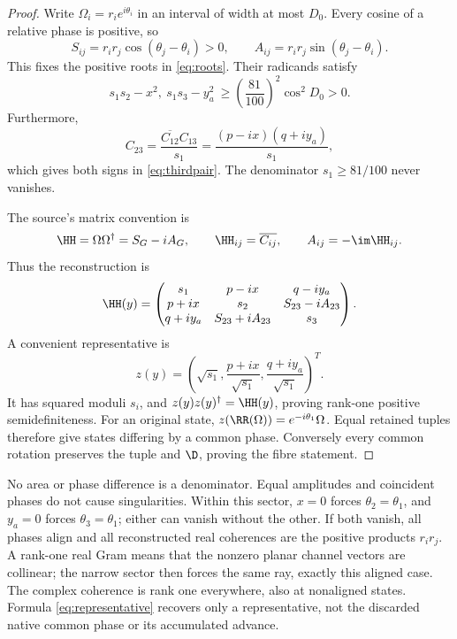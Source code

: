 \begin{proof}
Write \(\Omega_i=r_i e^{i\theta_i}\) in an interval of width at most \(D_0\). Every cosine of a relative phase is positive, so
\[
S_{ij}=r_ir_j\cos(\theta_j-\theta_i)>0,\qquad
A_{ij}=r_ir_j\sin(\theta_j-\theta_i).
\]
This fixes the positive roots in \eqref{eq:roots}. Their radicands satisfy
\begin{equation}
s_1s_2-x^2,\ s_1s_3-y_a^2
\ \ge\left(\frac{81}{100}\right)^2\cos^2D_0>0.
\label{eq:radicands}
\end{equation}
Furthermore,
\[
C_{23}=\frac{\overline{C_{12}}C_{13}}{s_1}
=\frac{(p-ix)(q+iy_a)}{s_1},
\]
which gives both signs in \eqref{eq:thirdpair}. The denominator \(s_1\ge81/100\) never vanishes.

The source's matrix convention is
\begin{equation}
\HH=\Omega\Omega^\dagger=S_G-iA_G,\qquad
\HH_{ij}=\overline{C_{ij}},\qquad A_{ij}=-\im\HH_{ij}.
\label{eq:Hconvention}
\end{equation}
Thus the reconstruction is
\begin{equation}
\HH(y)=
\begin{pmatrix}
s_1&p-ix&q-iy_a\\
p+ix&s_2&S_{23}-iA_{23}\\
q+iy_a&S_{23}+iA_{23}&s_3
\end{pmatrix}.
\label{eq:Hreconstructed}
\end{equation}
A convenient representative is
\begin{equation}
z(y)=
\left(\sqrt{s_1},\frac{p+ix}{\sqrt{s_1}},
\frac{q+iy_a}{\sqrt{s_1}}\right)^T.
\label{eq:representative}
\end{equation}
It has squared moduli \(s_i\), and \(z(y)z(y)^\dagger=\HH(y)\), proving rank-one positive semidefiniteness. For an original state,
\(z(\RR(\Omega))=e^{-i\theta_1}\Omega\).
Equal retained tuples therefore give states differing by a common phase. Conversely every common rotation preserves the tuple and \(\D\), proving the fibre statement.
\end{proof}

No area or phase difference is a denominator. Equal amplitudes and coincident phases do not cause singularities. Within this sector, \(x=0\) forces \(\theta_2=\theta_1\), and \(y_a=0\) forces \(\theta_3=\theta_1\); either can vanish without the other. If both vanish, all phases align and all reconstructed real coherences are the positive products \(r_ir_j\). A rank-one real Gram means that the nonzero planar channel vectors are collinear; the narrow sector then forces the same ray, exactly this aligned case. The complex coherence is rank one everywhere, also at nonaligned states. Formula \eqref{eq:representative} recovers only a representative, not the discarded native common phase or its accumulated advance.

